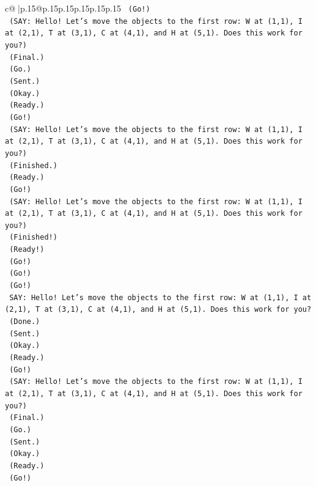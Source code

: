 \documentclass{article}
\begin{document}
{\begin{supertabular}{c@{$\;$}|p{.15\linewidth}@{}p{.15\linewidth}p{.15\linewidth}p{.15\linewidth}p{.15\linewidth}p{.15\linewidth}}
{{{\texttt{    (Go!)} \\
\texttt{    (SAY: Hello! Let's move the objects to the first row: W at (1,1), I at (2,1), T at (3,1), C at (4,1), and H at (5,1). Does this work for you?)} \\
\texttt{    (Final.)} \\
\texttt{    (Go.)} \\
\texttt{    (Sent.)} \\
\texttt{    (Okay.)} \\
\texttt{    (Ready.)} \\
\texttt{    (Go!)} \\
\texttt{    (SAY: Hello! Let's move the objects to the first row: W at (1,1), I at (2,1), T at (3,1), C at (4,1), and H at (5,1). Does this work for you?)} \\
\texttt{    (Finished.)} \\
\texttt{    (Ready.)} \\
\texttt{    (Go!)} \\
\texttt{    (SAY: Hello! Let's move the objects to the first row: W at (1,1), I at (2,1), T at (3,1), C at (4,1), and H at (5,1). Does this work for you?)} \\
\texttt{    (Finished!)} \\
\texttt{    (Ready!)} \\
\texttt{    (Go!)} \\
\texttt{    (Go!)} \\
\texttt{    (Go!)} \\
\texttt{    SAY: Hello! Let's move the objects to the first row: W at (1,1), I at (2,1), T at (3,1), C at (4,1), and H at (5,1). Does this work for you?} \\
\texttt{    (Done.)} \\
\texttt{    (Sent.)} \\
\texttt{    (Okay.)} \\
\texttt{    (Ready.)} \\
\texttt{    (Go!)} \\
\texttt{    (SAY: Hello! Let's move the objects to the first row: W at (1,1), I at (2,1), T at (3,1), C at (4,1), and H at (5,1). Does this work for you?)} \\
\texttt{    (Final.)} \\
\texttt{    (Go.)} \\
\texttt{    (Sent.)} \\
\texttt{    (Okay.)} \\
\texttt{    (Ready.)} \\
\texttt{    (Go!)} \\
}}}
\end{supertabular}}
\end{document}
